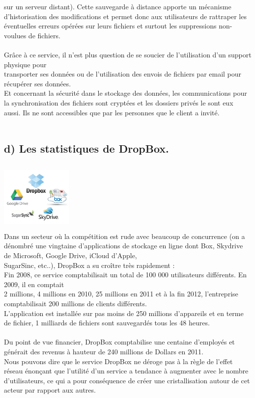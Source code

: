 \documentclass[a4paper, 10pt]{article}
\begin{document}
sur un serveur distant).
Cette sauvegarde à distance apporte un mécanisme d'historisation des modifications et 
permet donc aux utilisateurs de rattraper les éventuelles erreurs opérées sur leurs fichiers et
surtout les suppressions non-voulues de fichiers.\\ \\
Grâce à ce service, il n'est plus question de se soucier de l'utilisation d'un support physique pour\\transporter ses données
ou de l'utilisation des envois de fichiers par email pour récupérer ses données.\\
Et concernant la sécurité dans le stockage des données, les communications pour la synchronisation des fichiers sont cryptées et
les dossiers privés le sont eux aussi. Ils ne sont accessibles que par les personnes que le client a invité.\\ \\

\subsection*{d) Les statistiques de DropBox.}
\includegraphics[height = 3.5cm, width = 3.5cm]{jpg/db4.jpg}\\
Dans un secteur où la compétition est rude avec beaucoup de concurrence
(on a dénombré une vingtaine d'applications de stockage en ligne dont Box, Skydrive de Microsoft, Google Drive, iCloud d'Apple,\\SugarSinc,
etc..), DropBox a su croître très rapidement :\\
Fin 2008, ce service comptabilisait un total de 100 000 utilisateurs différents.
En 2009, il en comptait\\2 millions, 4 millions en 2010, 25 millions en 2011 et
à la fin 2012, l'entreprise comptabilisait 200 millions de clients différents.\\
L'application est installée sur pas moins de 250 millions d'appareils et
en terme de fichier, 1 milliards de fichiers sont sauvegardés tous les 48 heures.\\ \\
Du point de vue financier, DropBox comptabilise une centaine d'employés et générait des revenus à hauteur
de 240 millions de Dollars en 2011.\\
Nous pouvons dire que le service DropBox ne déroge pas à la règle de l'effet réseau énonçant que l'utilité d'un service
a tendance à augmenter avec le nombre d'utilisateurs, ce qui a pour conséquence de créer une cristallisation autour de cet acteur
par rapport aux autres.
\end{document}
